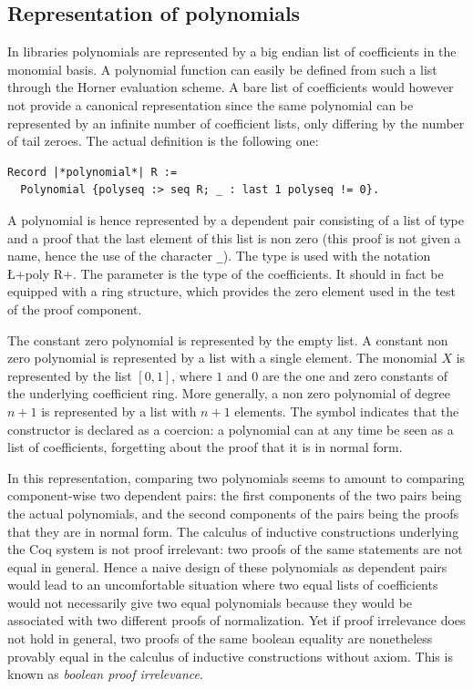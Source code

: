 \documentclass{mscs}
\begin{document}
\subsection{Representation of polynomials}\label{ssec:polys}
In \ssr{} libraries 
polynomials are represented by a big endian list of coefficients in
the monomial basis. A polynomial function can easily be defined from
such a list through the Horner evaluation scheme.
A bare list of coefficients would however not
provide a canonical representation since the same
polynomial can be represented by an infinite number of coefficient
lists, only differing by the number of tail zeroes. The actual
definition is the following one:
\begin{lstlisting}
Record |*polynomial*| R :=
  Polynomial {polyseq :> seq R; _ : last 1 polyseq != 0}.
\end{lstlisting}
A polynomial is hence
represented by a dependent pair consisting of a list  of
type  and a
proof that the last element of this list is non zero (this proof is
not given a name, hence the use of the character {\tt \_}). The type
 is used with the notation \L+{poly R}+. The
parameter  is the type of the coefficients. It should in fact
be equipped with a ring structure, which provides the zero element
used in the test of the proof component.

The constant zero polynomial is represented by the empty list. A
constant non zero polynomial is represented by a list with a single
element. The monomial $X$ is represented
by the list $[0, 1]$, where $1$ and $0$ are the one and zero
constants of the underlying coefficient ring.
More generally, a non zero polynomial of degree $n+1$ is
represented by a list with $n+1$ elements. The \C{:>} symbol indicates
that the  constructor is declared as a coercion: a
polynomial can at any time be seen as a list of coefficients,
forgetting about the proof that it is in normal form.

In this representation, comparing two polynomials seems to
amount to comparing component-wise two dependent pairs: the first
components of
the two pairs being the actual polynomials, and the second components
of the pairs being the proofs that they are in normal form.  The calculus of
inductive constructions underlying the Coq system is not proof
irrelevant: two proofs of the same statements are not equal in
general. Hence a naive design of these polynomials as dependent pairs
would lead to an uncomfortable situation where two equal lists of
coefficients would not necessarily give two equal polynomials because
they would be associated with two different proofs of normalization. Yet if
proof irrelevance does not hold in general, two proofs of the same
boolean equality are nonetheless provably equal in the calculus of
inductive constructions without axiom.  This is known as {\em boolean
  proof irrelevance}.
\end{document}
